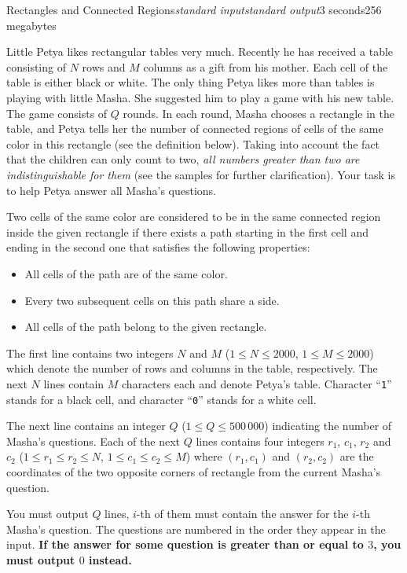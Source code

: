 \begin{problem}{Rectangles and Connected Regions}{\textsl{standard input}}{\textsl{standard output}}{3 seconds}{256 megabytes}

Little Petya likes rectangular tables very much. Recently he has received a table consisting of $N$ rows and $M$ columns as a gift from his mother. Each cell of the table is either black or white. The only thing Petya likes more than tables is playing with little Masha. She suggested him to play a game with his new table. The game consists of $Q$ rounds. In each round, Masha chooses a rectangle in the table, and Petya tells her the number of connected regions of cells of the same color in this rectangle (see the definition below). Taking into account the fact that the children can only count to two, \emph{all numbers greater than two are indistinguishable for them} (see the samples for further clarification). Your task is to help Petya answer all Masha's questions.

Two cells of the same color are considered to be in the same connected region inside the given rectangle if there exists a path starting in the first cell and ending in the second one that satisfies the following properties:
\begin{itemize}
\item All cells of the path are of the same color.
\item Every two subsequent cells on this path share a side.
\item All cells of the path belong to the given rectangle.
\end{itemize}

\InputFile
The first line contains two integers $N$ and $M$ ($1 \le N \le 2000$, $1 \le M \le 2000$) which denote the number of rows and columns in the table, respectively. The next $N$ lines contain $M$ characters each and denote Petya's table. Character ``\texttt{1}'' stands for a black cell, and character ``\texttt{0}'' stands for a white cell.

The next line contains an integer $Q$ ($1 \le Q \le 500\,000$) indicating the number of Masha's questions. Each of the next $Q$ lines contains four integers $r_1$, $c_1$, $r_2$ and $c_2$ ($1 \le r_1 \le r_2 \le N$, $1 \le c_1 \le c_2 \le M$) where $(r_1, c_1)$ and $(r_2, c_2)$ are the coordinates of the two opposite corners of rectangle from the current Masha's question.

\OutputFile
You must output $Q$ lines, $i$-th of them must contain the answer for the $i$-th Masha's question. The questions are numbered in the order they appear in the input. \textbf{If the answer for some question is greater than or equal to $3$, you must output $0$ instead.}

\Examples

\begin{example}
%
%
\end{example}

\end{problem}
